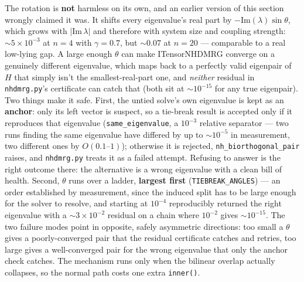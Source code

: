 \documentclass[11pt]{article}
\begin{document}
\begin{enumerate}
  The rotation is \textbf{not} harmless on its own, and an earlier version
  of this section wrongly claimed it was. It shifts every eigenvalue's
  real part by $-\mathrm{Im}(\lambda)\sin\theta$, which grows with
  $|\mathrm{Im}\,\lambda|$ and therefore with system size and coupling
  strength: $\sim5\times10^{-3}$ at $n=4$ with $\gamma=0.7$, but
  $\sim0.07$ at $n=20$ --- comparable to a real low-lying gap. A large
  enough $\theta$ can make ITensorNHDMRG converge on a genuinely different
  eigenvalue, which maps back to a perfectly valid eigenpair of $H$ that
  simply isn't the smallest-real-part one, and \emph{neither} residual in
  \texttt{nhdmrg.py}'s certificate can catch that (both sit at
  $\sim10^{-15}$ for any true eigenpair). Two things make it safe. First,
  the untied solve's own eigenvalue is kept as an \textbf{anchor}: only
  its left vector is suspect, so a tie-break result is accepted only if it
  reproduces that eigenvalue (\lstinline|same_eigenvalue|, a $10^{-3}$
  relative separator --- two runs finding the same eigenvalue have
  differed by up to $\sim10^{-5}$ in measurement, two different ones by
  $O(0.1\text{--}1)$); otherwise it is rejected,
  \lstinline|nh_biorthogonal_pair| raises, and \texttt{nhdmrg.py} treats
  it as a failed attempt. Refusing to answer is the right outcome there:
  the alternative is a wrong eigenvalue with a clean bill of health.
  Second, $\theta$ runs over a ladder, \textbf{largest first}
  (\lstinline|TIEBREAK_ANGLES|) --- an order established by measurement,
  since the induced split has to be large enough for the solver to
  resolve, and starting at $10^{-4}$ reproducibly returned the right
  eigenvalue with a $\sim3\times10^{-2}$ residual on a chain where
  $10^{-2}$ gives $\sim10^{-15}$. The two failure modes point in opposite,
  safely asymmetric directions: too small a $\theta$ gives a
  poorly-converged pair that the residual certificate catches and retries,
  too large gives a well-converged pair for the wrong eigenvalue that only
  the anchor check catches. The mechanism runs only when the bilinear
  overlap actually collapses, so the normal path costs one extra
  \lstinline|inner()|.
\end{enumerate}
\end{document}

